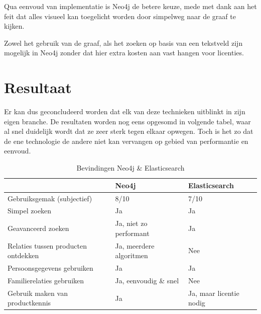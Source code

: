 Qua eenvoud van implementatie is Neo4j de betere keuze, mede met dank aan het feit dat alles visueel kan toegelicht worden door simpelweg naar de graaf te kijken. 

Zowel het gebruik van de graaf, als het zoeken op basis van een tekstveld zijn mogelijk in Neo4j zonder dat hier extra kosten aan vast hangen voor licenties. 

\section{Resultaat}
\label{sec:Resultaat}

Er kan dus geconcludeerd worden dat elk van deze technieken uitblinkt in zijn eigen branche. De resultaten worden nog eens opgesomd in volgende tabel, waar al snel duidelijk wordt dat ze zeer sterk tegen elkaar opwegen. Toch is het zo dat de ene technologie de andere niet kan vervangen op gebied van performantie en eenvoud.

\begin{table}[hbt!]
	\begin{tabular}{l|l|l|}
		\cline{2-3}
		& \cellcolor[HTML]{C0C0C0}Neo4j & \cellcolor[HTML]{C0C0C0}Elasticsearch \\ \hline
		\multicolumn{1}{|l|}{\cellcolor[HTML]{EFEFEF}Gebruiksgemak (subjectief)}      & 8/10                          & 7/10                                  \\ \hline
		\multicolumn{1}{|l|}{\cellcolor[HTML]{EFEFEF}Simpel zoeken}                   & Ja                            & Ja                                    \\ \hline
		\multicolumn{1}{|l|}{\cellcolor[HTML]{EFEFEF}Geavanceerd zoeken}              & Ja, niet zo performant        & Ja                                    \\ \hline
		\multicolumn{1}{|l|}{\cellcolor[HTML]{EFEFEF}Relaties tussen producten ontdekken}              & Ja, meerdere algoritmen       & Nee                    \\ \hline
		\multicolumn{1}{|l|}{\cellcolor[HTML]{EFEFEF}Persoonsgegevens gebruiken}              & Ja    & Ja                    \\ \hline
		\multicolumn{1}{|l|}{\cellcolor[HTML]{EFEFEF}Familierelaties gebruiken}       & Ja, eenvoudig \& snel         & Nee          \\ \hline
		\multicolumn{1}{|l|}{\cellcolor[HTML]{EFEFEF}Gebruik maken van productkennis} & Ja                            & Ja, maar licentie nodig               \\ \hline
	\end{tabular}
	\caption{\label{tab: Bevindingen Neo4j & Elasticsearch} Bevindingen Neo4j \& Elasticsearch}
\end{table}




